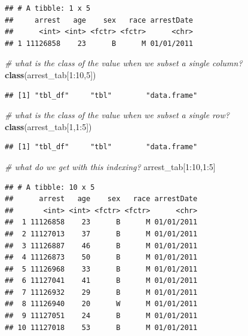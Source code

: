 \documentclass[]{article}
\newenvironment{Shaded}{\begin{snugshade}}{\end{snugshade}}
\newcommand{\KeywordTok}[1]{\textcolor[rgb]{0.13,0.29,0.53}{\textbf{{#1}}}}
\newcommand{\DecValTok}[1]{\textcolor[rgb]{0.00,0.00,0.81}{{#1}}}
\newcommand{\CommentTok}[1]{\textcolor[rgb]{0.56,0.35,0.01}{\textit{{#1}}}}
\newcommand{\NormalTok}[1]{{#1}}
\theoremstyle{definition}
\theoremstyle{definition}
\theoremstyle{remark}
\begin{document}
\begin{verbatim}
## # A tibble: 1 x 5
##     arrest   age    sex   race arrestDate
##      <int> <int> <fctr> <fctr>      <chr>
## 1 11126858    23      B      M 01/01/2011
\end{verbatim}

\begin{Shaded}
\begin{Highlighting}[]
\CommentTok{# what is the class of the value when we subset a single column?}
\KeywordTok{class}\NormalTok{(arrest_tab[}\DecValTok{1}\NormalTok{:}\DecValTok{10}\NormalTok{,}\DecValTok{5}\NormalTok{])}
\end{Highlighting}
\end{Shaded}

\begin{verbatim}
## [1] "tbl_df"     "tbl"        "data.frame"
\end{verbatim}

\begin{Shaded}
\begin{Highlighting}[]
\CommentTok{# what is the class of the value when we subset a single row?}
\KeywordTok{class}\NormalTok{(arrest_tab[}\DecValTok{1}\NormalTok{,}\DecValTok{1}\NormalTok{:}\DecValTok{5}\NormalTok{])}
\end{Highlighting}
\end{Shaded}

\begin{verbatim}
## [1] "tbl_df"     "tbl"        "data.frame"
\end{verbatim}

\begin{Shaded}
\begin{Highlighting}[]
\CommentTok{# what do we get with this indexing?}
\NormalTok{arrest_tab[}\DecValTok{1}\NormalTok{:}\DecValTok{10}\NormalTok{,}\DecValTok{1}\NormalTok{:}\DecValTok{5}\NormalTok{]}
\end{Highlighting}
\end{Shaded}

\begin{verbatim}
## # A tibble: 10 x 5
##      arrest   age    sex   race arrestDate
##       <int> <int> <fctr> <fctr>      <chr>
##  1 11126858    23      B      M 01/01/2011
##  2 11127013    37      B      M 01/01/2011
##  3 11126887    46      B      M 01/01/2011
##  4 11126873    50      B      M 01/01/2011
##  5 11126968    33      B      M 01/01/2011
##  6 11127041    41      B      M 01/01/2011
##  7 11126932    29      B      M 01/01/2011
##  8 11126940    20      W      M 01/01/2011
##  9 11127051    24      B      M 01/01/2011
## 10 11127018    53      B      M 01/01/2011
\end{verbatim}
\end{document}
